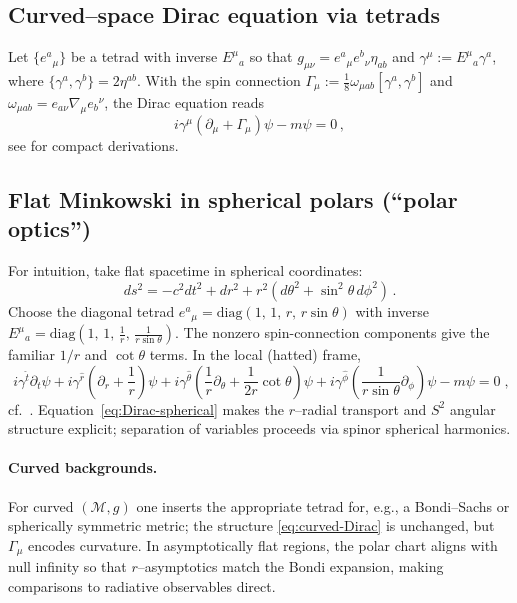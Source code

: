 \documentclass[12pt]{article}
\newcommand{\M}{\mathcal{M}}
\newcommand{\g}{g}
\begin{document}
\subsection{Curved–space Dirac equation via tetrads}
Let $\{e^a{}_\mu\}$ be a tetrad with inverse $E^\mu{}_a$ so that $\g_{\mu\nu}=e^a{}_\mu e^b{}_\nu \eta_{ab}$ and $\gamma^\mu:=E^\mu{}_a\gamma^a$, where $\{\gamma^a,\gamma^b\}=2\eta^{ab}$. With the spin connection $\Gamma_\mu:=\tfrac{1}{8}\omega_{\mu ab}[\gamma^a,\gamma^b]$ and $\omega_{\mu ab}=e_{a\nu}\nabla_\mu e_b{}^\nu$, the Dirac equation reads
\begin{equation}
\label{eq:curved-Dirac}
\boxed{\quad i\gamma^\mu\!\left(\partial_\mu+\Gamma_\mu\right)\psi - m\psi = 0\,, \quad}
\end{equation}
see \citet{Alcubierre2025,StoneTorsionNotes} for compact derivations.

\subsection{Flat Minkowski in spherical polars (``polar optics'')}
For intuition, take flat spacetime in spherical coordinates:
\[
ds^2=-c^2dt^2+dr^2+r^2(d\theta^2+\sin^2\!\theta\,d\phi^2)\,.
\]
Choose the diagonal tetrad $e^a{}_\mu=\mathrm{diag}(1,\,1,\,r,\,r\sin\theta)$ with inverse $E^\mu{}_a=\mathrm{diag}(1,\,1,\,\tfrac{1}{r},\,\tfrac{1}{r\sin\theta})$. The nonzero spin-connection components give the familiar $1/r$ and $\cot\theta$ terms. In the local (hatted) frame,
\begin{equation}
\label{eq:Dirac-spherical}
\boxed{\;
i\gamma^{\hat t}\partial_t\psi
+i\gamma^{\hat r}\!\left(\partial_r+\frac{1}{r}\right)\psi
+i\gamma^{\hat \theta}\!\left(\frac{1}{r}\partial_\theta+\frac{1}{2r}\cot\theta\right)\psi
+i\gamma^{\hat \phi}\!\left(\frac{1}{r\sin\theta}\partial_\phi\right)\psi
- m\psi=0\;,
}
\end{equation}
cf.\ \citet{Villalba1994,Alcubierre2025}. Equation~\eqref{eq:Dirac-spherical} makes the $r$--radial transport and $S^2$ angular structure explicit; separation of variables proceeds via spinor spherical harmonics.

\paragraph{Curved backgrounds.}
For curved $(\M,\g)$ one inserts the appropriate tetrad for, e.g., a Bondi--Sachs or spherically symmetric metric; the structure \eqref{eq:curved-Dirac} is unchanged, but $\Gamma_\mu$ encodes curvature. In asymptotically flat regions, the polar chart aligns with null infinity so that $r$–asymptotics match the Bondi expansion, making comparisons to radiative observables direct.
\end{document}
